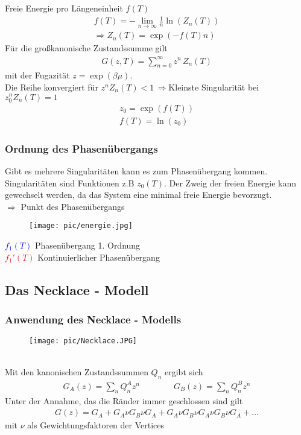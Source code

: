 \begin{frame}
\small
\vspace{0.9cm}
Freie Energie pro Längeneinheit $f(T)$
\begin{align*}
f(T)=-\lim_{n\rightarrow\infty} \frac1n \ln(Z_n(T))\\
\Rightarrow Z_n(T)=\exp(- f(T) n)
\end{align*}
\vspace{0.3cm}
Für die großkanonische Zustandssumme gilt
\begin{align*}
G(z,T)=\sum^{\infty}_{n=0}z^n\, Z_n(T)
\end{align*}
mit der Fugazität $z=\exp(\beta \mu)$.\\
\vspace{0.3cm}
Die Reihe konvergiert für $z^nZ_n(T)<1\,\Rightarrow$Kleinste Singularität bei $z_0^nZ_n(T)=1$ 
\begin{align*}
z_0=\exp( f(T))\\
f(T)=\ln(z_0)
\end{align*}
\end{frame}

\begin{frame}
\frametitle{\large Ordnung des Phasenübergangs}
\small
Gibt es mehrere Singularitäten kann es zum Phasenübergang kommen.
Singularitäten sind Funktionen z.B  $z_0(T)$. Der Zweig der freien Energie kann gewechselt werden, da das System eine minimal freie Energie bevorzugt.\\
\centering $\Rightarrow$ Punkt des Phasenübergangs
\vspace{0.3cm}
\begin{figure}[h]
	\centering
		\texttt{[image: pic/energie.jpg]}
\end{figure}
\centering
 \textcolor{blue}{$f_1(T)$} Phasenübergang 1. Ordnung\\
 \textcolor{red}{$f_1'(T)$} Kontinuierlicher Phasenübergang 
\end{frame}


\subsection{Das Necklace - Modell}
\begin{frame}
\frametitle{\large Anwendung des Necklace - Modells}
\begin{figure}[h]
	\centering
		\texttt{[image: pic/Necklace.JPG]}
\end{figure}
\\
\vspace{0.3cm}
\small
Mit den kanonischen Zustandssummen $Q_n$ ergibt sich
\begin{align*}
G_A(z)=\sum_n Q_n^A z^n \qquad \qquad G_B(z)=\sum_n Q_n^B z^n
\end{align*}
Unter der Annahme, das die Ränder immer geschlossen sind gilt
\begin{align*}
G(z)=G_A+G_A\nu G_B\nu G_A+G_A\nu G_B\nu G_A \nu G_B \nu G_A+...
\end{align*}
mit $\nu$ als Gewichtungsfaktoren der Vertices
\end{frame}

